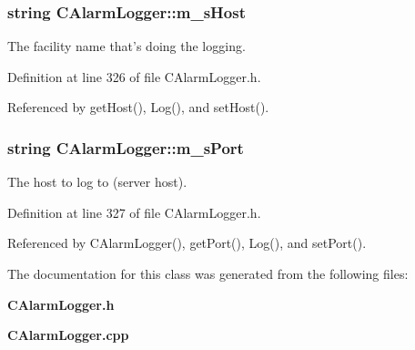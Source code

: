 \subsubsection{\setlength{\rightskip}{0pt plus 5cm}string CAlarm\-Logger::m\_\-s\-Host\hspace{0.3cm}{\tt  [private]}}\label{classCAlarmLogger_o1}


The facility name that's doing the logging.



Definition at line 326 of file CAlarm\-Logger.h.

Referenced by get\-Host(), Log(), and set\-Host().
\subsubsection{\setlength{\rightskip}{0pt plus 5cm}string CAlarm\-Logger::m\_\-s\-Port\hspace{0.3cm}{\tt  [private]}}\label{classCAlarmLogger_o2}


The host to log to (server host).



Definition at line 327 of file CAlarm\-Logger.h.

Referenced by CAlarm\-Logger(), get\-Port(), Log(), and set\-Port().

The documentation for this class was generated from the following files:\begin{CompactItemize}
\item 
{\bf CAlarm\-Logger.h}\item 
{\bf CAlarm\-Logger.cpp}\end{CompactItemize}
